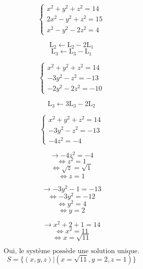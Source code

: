 \documentclass{article}
\begin{document}

\[
\begin{cases}
x^2 + y^2 + z^2 = 14 \\
2x^2 - y^2 + z^2 = 15 \\
x^2 - y^2 - 2z^2 = 4
\end{cases}
\]

\[
\text{L}_2 \leftarrow \text{L}_2 - 2\text{L}_1
\]
\[
\text{L}_3 \leftarrow \text{L}_3 - \text{L}_1
\]

\[
\begin{cases}
x^2 + y^2 + z^2 = 14 \\
-3y^2 - z^2 = -13 \\
-2y^2 - 2z^2 = -10
\end{cases}
\]

\[
\text{L}_3 \leftarrow 3\text{L}_3 - 2\text{L}_2
\]

\[
\begin{cases}
x^2 + y^2 + z^2 = 14 \\
-3y^2 - z^2 = -13 \\
-4z^2 = -4
\end{cases}
\]

\[
\rightarrow -4z^2 = -4
\]
\[
\Leftrightarrow z^2 = 1
\]
\[
\Leftrightarrow \sqrt{z} = \sqrt{1}
\]
\[
\Leftrightarrow z = 1
\]

\[
\rightarrow -3y^2 - 1 = -13
\]
\[
\Leftrightarrow -3y^2 = -12
\]
\[
\Leftrightarrow y^2 = 4
\]
\[
\Leftrightarrow y = 2
\]

\[
\rightarrow x^2 + 2 + 1 = 14
\]
\[
\Leftrightarrow x^2 = 11
\]
\[
\Leftrightarrow x = \sqrt{11}
\]

\[
\text{Oui, le système possède une solution unique.}
\]
\[
S = \{(x,y,z) | (x = \sqrt{11}, y = 2, z = 1)\}
\]
\end{document}
